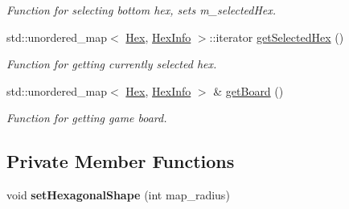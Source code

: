 \begin{DoxyCompactItemize}
\begin{DoxyCompactList}\small\item\em Function for selecting bottom hex, sets m\+\_\+selected\+Hex. \end{DoxyCompactList}\item 
std\+::unordered\+\_\+map$<$ \hyperlink{classHex}{Hex}, \hyperlink{structHexInfo}{Hex\+Info} $>$\+::iterator \hyperlink{classBoard_ad8eb316c6eb56a92ba3760fe898e7387}{get\+Selected\+Hex} ()
\begin{DoxyCompactList}\small\item\em Function for getting currently selected hex. \end{DoxyCompactList}\item 
std\+::unordered\+\_\+map$<$ \hyperlink{classHex}{Hex}, \hyperlink{structHexInfo}{Hex\+Info} $>$ \& \hyperlink{classBoard_a7fd500374a12179b5be2842add8e23ce}{get\+Board} ()
\begin{DoxyCompactList}\small\item\em Function for getting game board. \end{DoxyCompactList}\end{DoxyCompactItemize}
\subsection*{Private Member Functions}
\begin{DoxyCompactItemize}
\item 
void {\bfseries set\+Hexagonal\+Shape} (int map\+\_\+radius)\hypertarget{classBoard_ab948e11f0c0e881a784601eb4c9d7901}{}\label{classBoard_ab948e11f0c0e881a784601eb4c9d7901}

\end{DoxyCompactItemize}
